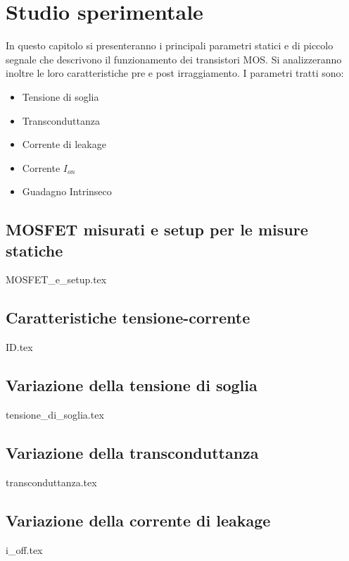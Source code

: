 \documentclass[
	a4paper,
	cleardoublepage=empty,
	headings=twolinechapter,
	numbers=autoenddot,
]{scrbook}
\begin{document}
\chapter{Studio sperimentale}
\label{cap2}
In questo capitolo si presenteranno i principali parametri statici e di piccolo segnale che descrivono il funzionamento dei transistori MOS. Si analizzeranno inoltre le loro caratteristiche pre e post irraggiamento. I parametri tratti sono:
\begin{itemize}
  \item Tensione di soglia
  \item Transconduttanza
  \item Corrente di leakage
  \item Corrente $I_{on}$
  \item Guadagno Intrinseco
\end{itemize}

\section{MOSFET misurati e setup per le misure statiche}
{MOSFET_e_setup.tex}
\FloatBarrier

\section{Caratteristiche tensione-corrente}
{ID.tex}
\FloatBarrier

\section{Variazione della tensione di soglia}
\label{cap2:vth}
{tensione_di_soglia.tex}

\section{Variazione della transconduttanza}\label{sec:transconduttanza}
{transconduttanza.tex}

\section{Variazione della corrente di leakage}
{i_off.tex}
\end{document}
